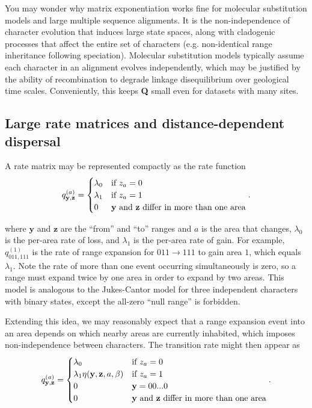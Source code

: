 You may wonder why matrix exponentiation works fine for molecular substitution models and large multiple sequence alignments.
It is the non-independence of character evolution that induces large state spaces, along with cladogenic processes that affect the entire set of characters (e.g. non-identical range inheritance following speciation).
Molecular substitution models typically assume each character in an alignment evolves independently, which may be justified by the ability of recombination to degrade linkage disequilibrium over geological time scales.
Conveniently, this keeps \textbf{Q} small even for datasets with many sites.

\subsection{Large rate matrices and distance-dependent dispersal}
\label{sec:rate_map}

A rate matrix may be represented compactly as the rate function
\[
q^{(a)}_{\textbf{y},\textbf{z}} =
\begin{cases}
\lambda_0 & \text{if $z_a=0$} \\
\lambda_1 & \text{if $z_a=1$} \\
0 & \text{\textbf{y} and \textbf{z} differ in more than one area}
\end{cases}.
\]

where $\textbf{y}$ and $\textbf{z}$ are the ``from'' and ``to'' ranges and $a$ is the area that changes, $\lambda_0$ is the per-area rate of loss, and $\lambda_1$ is the per-area rate of gain.
For example, $q^{(1)}_{011,111}$ is the rate of range expansion for $011 \rightarrow 111$ to gain area $1$, which equals $\lambda_1$.
Note the rate of more than one event occurring simultaneously is zero, so a range must expand twice by one area in order to expand by two areas.
This model is analogous to the Jukes-Cantor model for three independent characters with binary states, except the all-zero ``null range'' is forbidden.

Extending this idea, we may reasonably expect that a range expansion event into an area depends on which nearby areas are currently inhabited, which imposes non-independence between characters.
The transition rate might then appear as
\[
q^{(a)}_{\textbf{y},\textbf{z}} =
\begin{cases}
\lambda_0 & \text{if $z_a=0$}  \\
\lambda_1 \eta(\textbf{y}, \textbf{z}, a, \beta) & \text{if $z_a=1$} \\
0 & \mathbf{y} = 00...0 \\
0 & \text{\textbf{y} and \textbf{z} differ in more than one area}
\end{cases}.
\]

